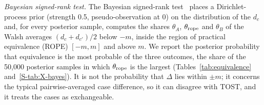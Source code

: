 \emph{Bayesian signed-rank test.} The Bayesian signed-rank test~\cite{Benavoli2017} places a Dirichlet-process prior (strength 0.5, pseudo-observation at 0) on the distribution of the $d_c$ and, for every posterior sample, computes the shares $\theta_A$, $\theta_{\rm rope}$ and $\theta_B$ of the Walsh averages $(d_c+d_{c'})/2$ below $-m$, inside the region of practical equivalence (ROPE) $[-m,m]$ and above $m$. We report the posterior probability that equivalence is the most probable of the three outcomes, the share of the 50{,}000 posterior samples in which $\theta_{\rm rope}$ is the largest (Tables~\ref{tab:equivalence} and~\ref{S-tab:X-bayes}). It is not the probability that $\Delta$ lies within $\pm m$; it concerns the typical pairwise-averaged case difference, so it can disagree with TOST, and it treats the cases as exchangeable.

